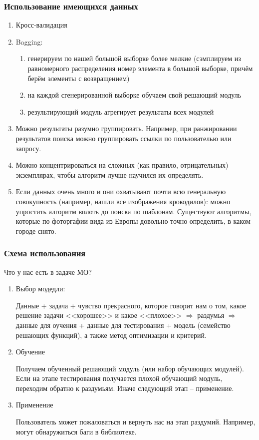 \documentclass[main.tex]{subfiles}
\begin{document}
\subsubsection{Использование имеющихся данных}

\begin{enumerate}
\item Кросс-валидация

\item Bagging:
\begin{enumerate}[noitemsep]
	\item генерируем по нашей большой выборке более мелкие (сэмплируем из равномерного распределения номер элемента в большой выборке, причём берём элементы с возвращением)
	\item на каждой сгенерированной выборке обучаем свой решающий модуль
	\item результирующий модуль агрегирует результаты всех модулей
\end{enumerate}

\item Можно результаты разумно группировать.
Например, при ранжировании результатов поиска можно группировать ссылки по пользователью или запросу.

\item Можно концентрироваться на сложных (как правило, отрицательных) экземплярах, чтобы алгоритм лучше научился их определять.

\item Если данных очень много и они охватывают почти всю генеральную совокупность (например, нашли все изображения крокодилов): можно упростить алгоритм вплоть до поиска по шаблонам.
Существуют алгоритмы, которые по фоторгафии вида из Европы довольно точно определить, в каком городе снято.
\end{enumerate}

\subsubsection{Схема использования}

Что у нас есть в задаче МО?

\begin{enumerate}
	\item Выбор модедли:
	
	Данные + задача + чувство прекрасного, которое говорит нам о том, какое решение задачи <<хорошее>> и какое <<плохое>> $ \Rightarrow $ раздумья $ \Rightarrow $ данные для оучения + данные для тестирования + модель (семейство решающих функций), а также метод оптимизации и критерий.
	
	\item Обучение
	
	Получаем обученный решающий модуль (или набор обучающих модулей).
	Если на этапе тестирования получается плохой обучающий модуль, переходим обратно к раздумьям.
	Иначе следующий этап -- применение.
	
	\item Применение
	
	Пользователь может пожаловаться и вернуть нас на этап раздумий.
	Например, могут обнаружиться баги в библиотеке.
\end{enumerate}
\end{document}
